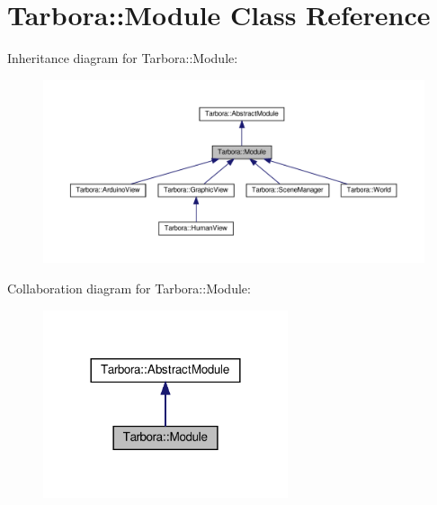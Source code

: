 \hypertarget{classTarbora_1_1Module}{}\section{Tarbora\+:\+:Module Class Reference}
\label{classTarbora_1_1Module}


Inheritance diagram for Tarbora\+:\+:Module\+:\nopagebreak
\begin{figure}[H]
\begin{center}
\leavevmode
\includegraphics[width=350pt]{classTarbora_1_1Module__inherit__graph}
\end{center}
\end{figure}


Collaboration diagram for Tarbora\+:\+:Module\+:\nopagebreak
\begin{figure}[H]
\begin{center}
\leavevmode
\includegraphics[width=204pt]{classTarbora_1_1Module__coll__graph}
\end{center}
\end{figure}
